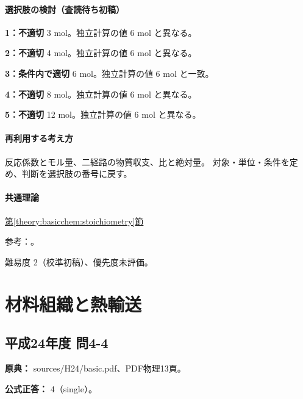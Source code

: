 \paragraph{選択肢の検討（査読待ち初稿）}\mbox{}\par

\noindent\textbf{1：不適切} 3 mol。独立計算の値 6 mol と異なる。\par

\noindent\textbf{2：不適切} 4 mol。独立計算の値 6 mol と異なる。\par

\noindent\textbf{3：条件内で適切} 6 mol。独立計算の値 6 mol と一致。\par

\noindent\textbf{4：不適切} 8 mol。独立計算の値 6 mol と異なる。\par

\noindent\textbf{5：不適切} 12 mol。独立計算の値 6 mol と異なる。\par

\paragraph{再利用する考え方} 反応係数とモル量、二経路の物質収支、比と絶対量。 対象・単位・条件を定め、判断を選択肢の番号に戻す。

\paragraph{共通理論} \hyperref[theory:basicchem:stoichiometry]{第\ref*{theory:basicchem:stoichiometry}節}

\par 参考：\cite{chem55_stoich}。

\par 難易度 2（校準初稿）、優先度未評価。

\section{材料組織と熱輸送}

\subsection{平成24年度 問4-4}
\label{q:h24-reg-basic-4-4}

\noindent\textbf{原典：} sources/H24/basic.pdf、PDF物理13頁。

\textbf{公式正答：} 4（single）。

